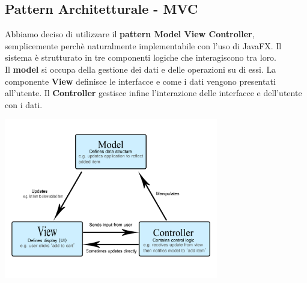 \documentclass[11pt]{article}
\begin{document}
        \subsection{Pattern Architetturale - MVC}
        Abbiamo deciso di utilizzare il \textbf{pattern Model View Controller}, semplicemente perchè naturalmente implementabile con l'uso di JavaFX. Il sistema è strutturato in tre componenti logiche che interagiscono tra loro.\\
        Il \textbf{model} si occupa della gestione dei dati e delle operazioni su di essi. La componente \textbf{View} definisce le interfacce e come i dati vengono presentati all'utente. Il \textbf{Controller} 
        gestisce infine l'interazione delle interfacce e dell'utente con i dati.
            \begin{center}
                \includegraphics[width=0.70\textwidth]{pictures/mvc.png}
            \end{center}
            
    \newpage
\end{document}
